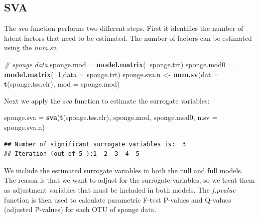 \documentclass[]{book}
\newenvironment{Shaded}{\begin{snugshade}}{\end{snugshade}}
\newcommand{\KeywordTok}[1]{\textcolor[rgb]{0.13,0.29,0.53}{\textbf{#1}}}
\newcommand{\DataTypeTok}[1]{\textcolor[rgb]{0.13,0.29,0.53}{#1}}
\newcommand{\DecValTok}[1]{\textcolor[rgb]{0.00,0.00,0.81}{#1}}
\newcommand{\StringTok}[1]{\textcolor[rgb]{0.31,0.60,0.02}{#1}}
\newcommand{\CommentTok}[1]{\textcolor[rgb]{0.56,0.35,0.01}{\textit{#1}}}
\newcommand{\OperatorTok}[1]{\textcolor[rgb]{0.81,0.36,0.00}{\textbf{#1}}}
\newcommand{\NormalTok}[1]{#1}
\begin{document}
\subsection{SVA}\label{sva}

The \emph{sva} function performs two different steps. First it
identifies the number of latent factors that need to be estimated. The
number of factors can be estimated using the \emph{num.sv}.

\begin{Shaded}
\begin{Highlighting}[]
\CommentTok{# sponge data}
\NormalTok{sponge.mod =}\StringTok{ }\KeywordTok{model.matrix}\NormalTok{(}\OperatorTok{~}\NormalTok{sponge.trt)}
\NormalTok{sponge.mod0 =}\StringTok{ }\KeywordTok{model.matrix}\NormalTok{(}\OperatorTok{~}\DecValTok{1}\NormalTok{,}\DataTypeTok{data =}\NormalTok{ sponge.trt)}
\NormalTok{sponge.sva.n <-}\StringTok{ }\KeywordTok{num.sv}\NormalTok{(}\DataTypeTok{dat =} \KeywordTok{t}\NormalTok{(sponge.tss.clr), }\DataTypeTok{mod =}\NormalTok{ sponge.mod)}
\end{Highlighting}
\end{Shaded}

Next we apply the \emph{sva} function to estimate the surrogate
variables:

\begin{Shaded}
\begin{Highlighting}[]
\NormalTok{sponge.sva =}\StringTok{ }\KeywordTok{sva}\NormalTok{(}\KeywordTok{t}\NormalTok{(sponge.tss.clr), sponge.mod, sponge.mod0, }\DataTypeTok{n.sv =}\NormalTok{ sponge.sva.n)}
\end{Highlighting}
\end{Shaded}

\begin{verbatim}
## Number of significant surrogate variables is:  3 
## Iteration (out of 5 ):1  2  3  4  5
\end{verbatim}

We include the estimated surrogate variables in both the null and full
models. The reason is that we want to adjust for the surrogate
variables, so we treat them as adjustment variables that must be
included in both models. The \emph{f.pvalue} function is then used to
calculate parametric F-test P-values and Q-values (adjusted P-values)
for each OTU of sponge data.

\begin{Shaded}
\end{Shaded}
\end{document}
